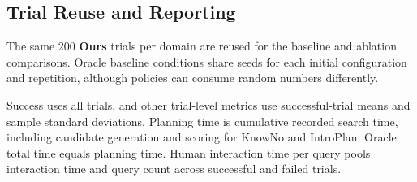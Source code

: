 \subsection{Trial Reuse and Reporting}\label{appx:oracle_reference}\label{appx:randomization}\label{appx:metric_details}
The same $200$ \textbf{Ours} trials per domain are reused for the baseline and ablation comparisons. Oracle baseline conditions share seeds for each initial configuration and repetition, although policies can consume random numbers differently.

Success uses all trials, and other trial-level metrics use successful-trial means and sample standard deviations. Planning time is cumulative recorded search time, including candidate generation and scoring for KnowNo and IntroPlan. Oracle total time equals planning time. Human interaction time per query pools interaction time and query count across successful and failed trials.
